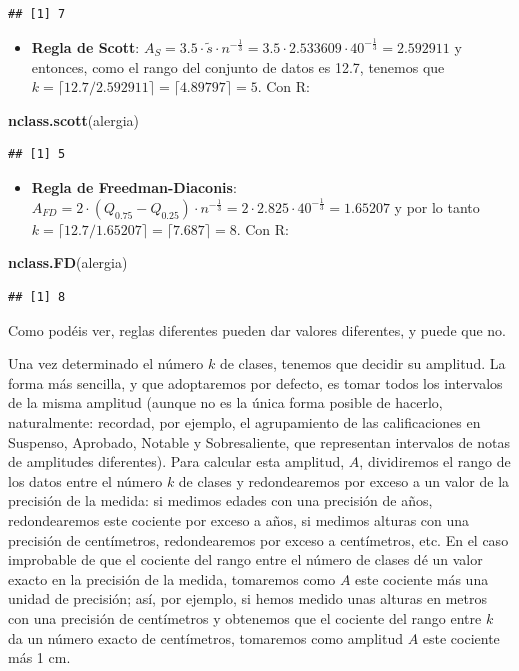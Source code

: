 \documentclass[]{book}
\newenvironment{Shaded}{\begin{snugshade}}{\end{snugshade}}
\newcommand{\KeywordTok}[1]{\textcolor[rgb]{0.13,0.29,0.53}{\textbf{#1}}}
\newcommand{\NormalTok}[1]{#1}
\providecommand{\tightlist}{%
  \setlength{\itemsep}{0pt}\setlength{\parskip}{0pt}}
\theoremstyle{definition}
\theoremstyle{definition}
\theoremstyle{definition}
\theoremstyle{remark}
\begin{document}
\begin{verbatim}
## [1] 7
\end{verbatim}

\begin{itemize}
\tightlist
\item
  \textbf{Regla de Scott}: \(A_{S}= 3.5\cdot \widetilde{s}\cdot n^{-\frac{1}{3}}=3.5\cdot 2.533609 \cdot 40^{-\frac{1}{3}}= 2.592911\) y entonces, como el rango del conjunto de datos es 12.7, tenemos que \(k=\lceil {12.7}/{2.592911}\rceil=\lceil 4.89797\rceil=5\). Con R:
\end{itemize}

\begin{Shaded}
\begin{Highlighting}[]
\KeywordTok{nclass.scott}\NormalTok{(alergia)}
\end{Highlighting}
\end{Shaded}

\begin{verbatim}
## [1] 5
\end{verbatim}

\begin{itemize}
\tightlist
\item
  \textbf{Regla de Freedman-Diaconis}: \(A_{FD}= 2 \cdot (Q_{0.75}-Q_{0.25}) \cdot n^{-\frac{1}{3}}=2\cdot 2.825 \cdot 40^{-\frac{1}{3}}=1.65207\) y por lo tanto \(k= \lceil {12.7}/{1.65207}\rceil=\lceil 7.687\rceil=8\). Con R:
\end{itemize}

\begin{Shaded}
\begin{Highlighting}[]
\KeywordTok{nclass.FD}\NormalTok{(alergia)}
\end{Highlighting}
\end{Shaded}

\begin{verbatim}
## [1] 8
\end{verbatim}

Como podéis ver, reglas diferentes pueden dar valores diferentes, y puede que no.

Una vez determinado el número \(k\) de clases, tenemos que decidir su amplitud. La forma más sencilla, y que adoptaremos por defecto, es tomar todos los intervalos de la misma amplitud (aunque no es la única forma posible de hacerlo, naturalmente: recordad, por ejemplo, el agrupamiento de las calificaciones en Suspenso, Aprobado, Notable y Sobresaliente, que representan intervalos de notas de amplitudes diferentes). Para calcular esta amplitud, \(A\), dividiremos el rango de los datos entre el número \(k\) de clases y redondearemos por exceso a un valor de la precisión de la medida: si medimos edades con una precisión de años, redondearemos este cociente por exceso a años, si medimos alturas con una precisión de centímetros, redondearemos por exceso a centímetros, etc. En el caso improbable de que el cociente del rango entre el número de clases dé un valor exacto en la precisión de la medida, tomaremos como \(A\) este cociente más una unidad de precisión; así, por ejemplo, si hemos medido unas alturas en metros con una precisión de centímetros y obtenemos que el cociente del rango entre \(k\) da un número exacto de centímetros, tomaremos como amplitud \(A\) este cociente más 1 cm.
\end{document}
